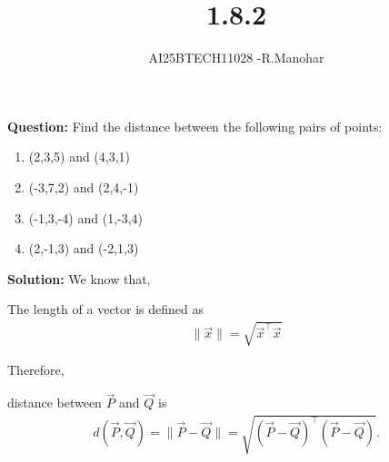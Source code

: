 \documentclass[journal,12pt,onecolumn]{IEEEtran}
\title{1.8.2}
\author{AI25BTECH11028 -R.Manohar}
\begin{document}
\maketitle
{\let\newpage\relax\maketitle}
\renewcommand{\thefigure}{\theenumi}\renewcommand{\thetable}{\theenumi}
 \bigskip

\textbf{Question:}
Find the distance between the following pairs of points:
\begin{enumerate}
\item (2,3,5) and (4,3,1)
\item (-3,7,2) and (2,4,-1)
\item (-1,3,-4) and (1,-3,4)
\item (2,-1,3) and (-2,1,3)
\end{enumerate}

\textbf{Solution:}
We know that,

The length of a vector is defined as
\begin{align}
    \|\vec{x}\| = \sqrt{\vec{x}^\top \vec{x}}
\end{align}

Therefore,

 distance between $\vec{P}$ and $\vec{Q}$ is
\begin{align}
d(\vec{P},\vec{Q}) = \|\vec{P}-\vec{Q}\|
= \sqrt{(\vec{P}-\vec{Q})^\top(\vec{P}-\vec{Q})}.
\end{align}
\end{document}
